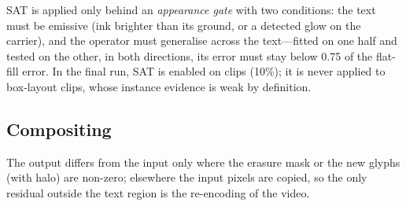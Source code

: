SAT is applied only behind an \emph{appearance gate} with two conditions: the text must be emissive (ink brighter than its ground, or a detected glow on the carrier), and the operator must generalise across the text---fitted on one half and tested on the other, in both directions, its error must stay below 0.75 of the flat-fill error. In the final run, SAT is enabled on \rSatOn{} clips (10\%); it is never applied to box-layout clips, whose instance evidence is weak by definition.

\subsection{Compositing}
The output differs from the input only where the erasure mask or the new glyphs (with halo) are non-zero; elsewhere the input pixels are copied, so the only residual outside the text region is the re-encoding of the video.
